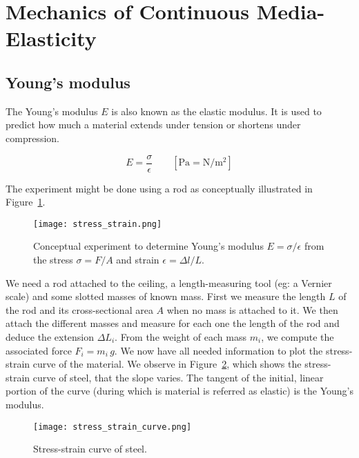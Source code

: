 \section{Mechanics of Continuous Media-Elasticity}
\subsection{Young's modulus}
The Young's modulus $E$ is also known as the elastic modulus.
It is used to predict how much a material extends under tension
or shortens under compression.

\begin{equation*}
  E = \frac{\sigma}{\epsilon} \qquad 
  [\si{\pascal} = \si{\newton\per\meter\squared}]
\end{equation*}

The experiment might be done using a rod as conceptually
illustrated in Figure~\ref{fig:stress_strain}.

\begin{figure}
  \begin{center}
    \texttt{[image: stress\_strain.png]}
    \caption{Conceptual experiment to determine 
    Young's modulus $E = \sigma/\epsilon$
    from the stress $\sigma = F/A$ and strain $\epsilon = \Delta l/L$.}
    \label{fig:stress_strain}
  \end{center}
\end{figure}

We need a rod attached to the ceiling, a length-measuring tool
(eg: a Vernier scale) and some slotted masses of known mass.
First we measure the length $L$ of the rod
and its cross-sectional area $A$ when no mass is attached to it.
We then attach the different masses and measure for each one
the length of the rod and deduce the extension $\Delta L_i$.
From the weight of each mass $m_i$,
we compute the associated force $F_i = m_i \, g$.
We now have all needed information to plot
the stress-strain curve of the material.
We observe in Figure~\ref{fig:stress_strain_curve},
which shows the stress-strain curve of steel,
that the slope varies.
The tangent of the initial, linear portion of the curve
(during which is material is referred as elastic) 
is the Young's modulus.

\begin{figure}
  \begin{center}
    \texttt{[image: stress\_strain\_curve.png]}
    \caption{Stress-strain curve of steel.}
    \label{fig:stress_strain_curve}
  \end{center}
\end{figure}

